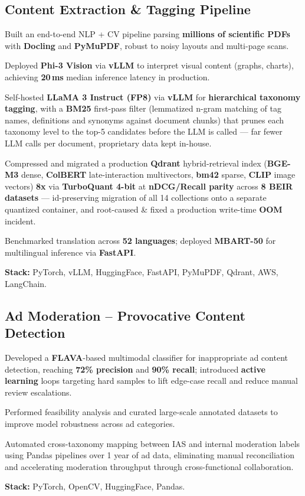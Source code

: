 \documentclass[letter,10pt]{article}
\begin{document}
\subsection{Content Extraction \& Tagging Pipeline}
\begin{zitemize}
\item Built an end-to-end NLP + CV pipeline parsing \textbf{millions of scientific PDFs} with \textbf{Docling} and \textbf{PyMuPDF}, robust to noisy layouts and multi-page scans.
\item Deployed \textbf{Phi-3 Vision} via \textbf{vLLM} to interpret visual content (graphs, charts), achieving \textbf{20\,ms} median inference latency in production.
\item Self-hosted \textbf{LLaMA 3 Instruct (FP8)} via \textbf{vLLM} for \textbf{hierarchical taxonomy tagging}, with a \textbf{BM25} first-pass filter (lemmatized n-gram matching of tag names, definitions and synonyms against document chunks) that prunes each taxonomy level to the top-5 candidates before the LLM is called --- far fewer LLM calls per document, proprietary data kept in-house.
\item Compressed and migrated a production \textbf{Qdrant} hybrid-retrieval index (\textbf{BGE-M3} dense, \textbf{ColBERT} late-interaction multivectors, \textbf{bm42} sparse, \textbf{CLIP} image vectors) \textbf{8x} via \textbf{TurboQuant 4-bit} at \textbf{nDCG/Recall parity} across \textbf{8 BEIR datasets} --- id-preserving migration of all 14 collections onto a separate quantized container, and root-caused \& fixed a production write-time \textbf{OOM} incident.
\item Benchmarked translation across \textbf{52 languages}; deployed \textbf{MBART-50} for multilingual inference via \textbf{FastAPI}.
\item \textbf{Stack:} PyTorch, vLLM, HuggingFace, FastAPI, PyMuPDF, Qdrant, AWS, LangChain.
\end{zitemize}

\subsection{Ad Moderation -- Provocative Content Detection}
\begin{zitemize}
\item Developed a \textbf{FLAVA}-based multimodal classifier for inappropriate ad content detection, reaching \textbf{72\% precision} and \textbf{90\% recall}; introduced \textbf{active learning} loops targeting hard samples to lift edge-case recall and reduce manual review escalations.
\item Performed feasibility analysis and curated large-scale annotated datasets to improve model robustness across ad categories.
\item Automated cross-taxonomy mapping between IAS and internal moderation labels using Pandas pipelines over 1 year of ad data, eliminating manual reconciliation and accelerating moderation throughput through cross-functional collaboration.
\item \textbf{Stack:} PyTorch, OpenCV, HuggingFace, Pandas.
\end{zitemize}
\end{document}
